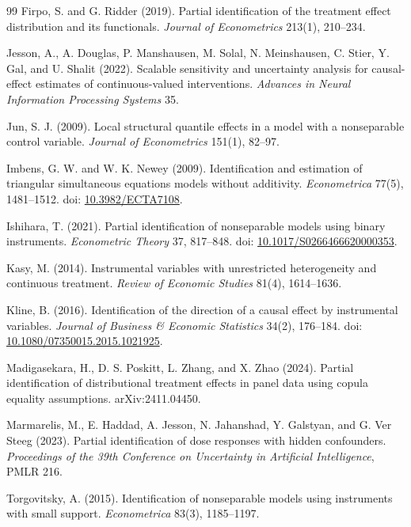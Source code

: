 \documentclass[11pt]{article}
\theoremstyle{definition}
\theoremstyle{plain}
\theoremstyle{remark}
\begin{document}
\begin{thebibliography}{99}
Firpo, S. and G. Ridder (2019).
\newblock Partial identification of the treatment effect distribution and its functionals.
\newblock \emph{Journal of Econometrics} 213(1), 210--234.

Jesson, A., A. Douglas, P. Manshausen, M. Solal, N. Meinshausen, C. Stier, Y. Gal, and U. Shalit (2022).
\newblock Scalable sensitivity and uncertainty analysis for causal-effect estimates of continuous-valued interventions.
\newblock \emph{Advances in Neural Information Processing Systems} 35.

Jun, S. J. (2009).
\newblock Local structural quantile effects in a model with a nonseparable control variable.
\newblock \emph{Journal of Econometrics} 151(1), 82--97.

Imbens, G. W. and W. K. Newey (2009).
\newblock Identification and estimation of triangular simultaneous equations models without additivity.
\newblock \emph{Econometrica} 77(5), 1481--1512.
\newblock doi: \href{https://doi.org/10.3982/ECTA7108}{10.3982/ECTA7108}.

Ishihara, T. (2021).
\newblock Partial identification of nonseparable models using binary instruments.
\newblock \emph{Econometric Theory} 37, 817--848.
\newblock doi: \href{https://doi.org/10.1017/S0266466620000353}{10.1017/S0266466620000353}.

Kasy, M. (2014).
\newblock Instrumental variables with unrestricted heterogeneity and continuous treatment.
\newblock \emph{Review of Economic Studies} 81(4), 1614--1636.

Kline, B. (2016).
\newblock Identification of the direction of a causal effect by instrumental variables.
\newblock \emph{Journal of Business \& Economic Statistics} 34(2), 176--184.
\newblock doi: \href{https://doi.org/10.1080/07350015.2015.1021925}{10.1080/07350015.2015.1021925}.

Madigasekara, H., D. S. Poskitt, L. Zhang, and X. Zhao (2024).
\newblock Partial identification of distributional treatment effects in panel data using copula equality assumptions.
\newblock arXiv:2411.04450.

Marmarelis, M., E. Haddad, A. Jesson, N. Jahanshad, Y. Galstyan, and G. Ver Steeg (2023).
\newblock Partial identification of dose responses with hidden confounders.
\newblock \emph{Proceedings of the 39th Conference on Uncertainty in Artificial Intelligence}, PMLR 216.

Torgovitsky, A. (2015).
\newblock Identification of nonseparable models using instruments with small support.
\newblock \emph{Econometrica} 83(3), 1185--1197.
\end{thebibliography}
\end{document}
